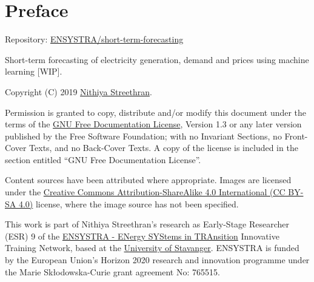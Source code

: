 \hypertarget{preface}{%
\section{Preface}\label{preface}}

Repository:
\href{https://github.com/ENSYSTRA/short-term-forecasting}{ENSYSTRA/short-term-forecasting}

Short-term forecasting of electricity generation, demand and prices
using machine learning {[}WIP{]}.

Copyright (C) 2019 \href{mailto:nmstreethran@gmail.com}{Nithiya
Streethran}.

Permission is granted to copy, distribute and/or modify this document
under the terms of the \href{https://www.gnu.org/licenses/fdl-1.3}{GNU
Free Documentation License}, Version 1.3 or any later version published
by the Free Software Foundation; with no Invariant Sections, no
Front-Cover Texts, and no Back-Cover Texts. A copy of the license is
included in the section entitled ``GNU Free Documentation License''.

Content sources have been attributed where appropriate. Images are
licensed under the
\href{https://creativecommons.org/licenses/by-sa/4.0/}{Creative Commons
Attribution-ShareAlike 4.0 International (CC BY-SA 4.0)} license, where
the image source has not been specified.

This work is part of Nithiya Streethran's research as Early-Stage
Researcher (ESR) 9 of the \href{https://ensystra.eu/}{ENSYSTRA - ENergy
SYStems in TRAnsition} Innovative Training Network, based at the
\href{https://www.uis.no/}{University of Stavanger}. ENSYSTRA is funded
by the European Union's Horizon 2020 research and innovation programme
under the Marie Skłodowska-Curie grant agreement No: 765515.
